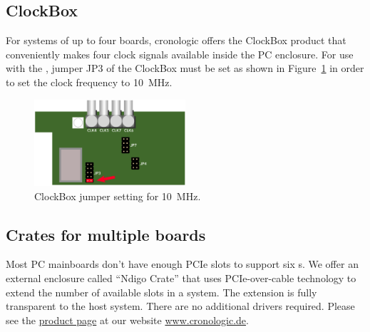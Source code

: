 {        \subsection{ClockBox}
            For systems of up to four boards, cronologic offers the ClockBox
            product that conveniently makes four clock signals available
            inside the PC enclosure. For use with the \deviceName, jumper JP3
            of the ClockBox must be set as shown in Figure~\ref{fig:clockbox}
            in order to set the clock frequency to \SI{10}{\mega\hertz}. 
            \begin{figure}[htb]
                \centering
                    \includegraphics[width=0.5\textwidth]{
                        xhptdc/figures/clockbox.pdf}				
                    \caption{ClockBox jumper setting for
                        \SI{10}{\mega\hertz}.\label{fig:clockbox}}
            \end{figure}
        
        \subsection{Crates for multiple boards}
            Most PC mainboards don't have enough PCIe slots to support six
            \deviceName s.  We offer an external enclosure called ``Ndigo
            Crate'' that uses PCIe-over-cable technology to extend the number
            of available slots in a system.  The extension is fully
            transparent to the host system. There are no additional drivers
            required.  Please see the
            \href{https://www.cronologic.de/products/pcie/pcie-crates}{%
                product page} at our website \url{www.cronologic.de}.
}{}




    


